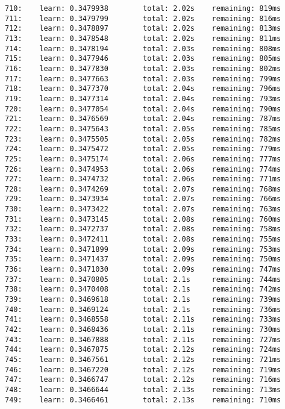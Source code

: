 \documentclass[11pt]{article}
\begin{document}
\begin{Verbatim}[commandchars=\\\{\}]
710:    learn: 0.3479938        total: 2.02s    remaining: 819ms
711:    learn: 0.3479799        total: 2.02s    remaining: 816ms
712:    learn: 0.3478897        total: 2.02s    remaining: 813ms
713:    learn: 0.3478548        total: 2.02s    remaining: 811ms
714:    learn: 0.3478194        total: 2.03s    remaining: 808ms
715:    learn: 0.3477946        total: 2.03s    remaining: 805ms
716:    learn: 0.3477830        total: 2.03s    remaining: 802ms
717:    learn: 0.3477663        total: 2.03s    remaining: 799ms
718:    learn: 0.3477370        total: 2.04s    remaining: 796ms
719:    learn: 0.3477314        total: 2.04s    remaining: 793ms
720:    learn: 0.3477054        total: 2.04s    remaining: 790ms
721:    learn: 0.3476569        total: 2.04s    remaining: 787ms
722:    learn: 0.3475643        total: 2.05s    remaining: 785ms
723:    learn: 0.3475505        total: 2.05s    remaining: 782ms
724:    learn: 0.3475472        total: 2.05s    remaining: 779ms
725:    learn: 0.3475174        total: 2.06s    remaining: 777ms
726:    learn: 0.3474953        total: 2.06s    remaining: 774ms
727:    learn: 0.3474732        total: 2.06s    remaining: 771ms
728:    learn: 0.3474269        total: 2.07s    remaining: 768ms
729:    learn: 0.3473934        total: 2.07s    remaining: 766ms
730:    learn: 0.3473422        total: 2.07s    remaining: 763ms
731:    learn: 0.3473145        total: 2.08s    remaining: 760ms
732:    learn: 0.3472737        total: 2.08s    remaining: 758ms
733:    learn: 0.3472411        total: 2.08s    remaining: 755ms
734:    learn: 0.3471899        total: 2.09s    remaining: 753ms
735:    learn: 0.3471437        total: 2.09s    remaining: 750ms
736:    learn: 0.3471030        total: 2.09s    remaining: 747ms
737:    learn: 0.3470805        total: 2.1s     remaining: 744ms
738:    learn: 0.3470408        total: 2.1s     remaining: 742ms
739:    learn: 0.3469618        total: 2.1s     remaining: 739ms
740:    learn: 0.3469124        total: 2.1s     remaining: 736ms
741:    learn: 0.3468558        total: 2.11s    remaining: 733ms
742:    learn: 0.3468436        total: 2.11s    remaining: 730ms
743:    learn: 0.3467888        total: 2.11s    remaining: 727ms
744:    learn: 0.3467875        total: 2.12s    remaining: 724ms
745:    learn: 0.3467561        total: 2.12s    remaining: 721ms
746:    learn: 0.3467220        total: 2.12s    remaining: 719ms
747:    learn: 0.3466747        total: 2.12s    remaining: 716ms
748:    learn: 0.3466644        total: 2.13s    remaining: 713ms
749:    learn: 0.3466461        total: 2.13s    remaining: 710ms

\end{Verbatim}
\end{document}
